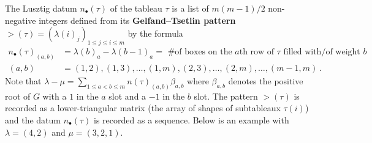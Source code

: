 \documentclass{article} %
\begin{document}
The Lusztig datum $n_\bullet(\tau)$ of the tableau $\tau$ is a list of $ m(m-1)/2$ non-negative integers defined from its \textbf{Gelfand--Tsetlin pattern} $\gt(\tau) = (\lambda(i)_j)_{1\le j\le i\le m}$ by the formula 
$$
\begin{aligned}
n_\bullet(\tau)_{(a,b)} &= \lambda(b)_a - \lambda(b-1)_a = \text{ \# of boxes on the $a$th row of $\tau $ filled with/of weight $b$}  \\
(a,b) &=  (1,2),(1,3),\dots,(1,m),%
(2,3),\dots,(2,m),%
\dots,%
(m-1,m)\,. 
\end{aligned}
$$
Note that $ \lambda - \mu = \displaystyle{\sum_{1 \le a < b \le m}n(\tau)_{(a,b)} \beta_{a,b}} $ where $ \beta_{a,b} $ denotes the positive root of $ G$ with a $ 1 $ in the $a $ slot and a $-1$ in the $ b $ slot.
% 
The pattern $\gt(\tau)$ is recorded as a lower-triangular matrix (the array of shapes of subtableaux $\tau(i)$) and the datum $n_\bullet(\tau)$ is recorded as a sequence.  Below is an example with $\lambda = (4,2)$ and $\mu = (3,2,1)$.


\end{document}
